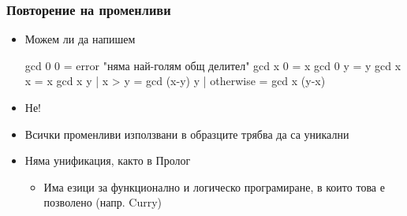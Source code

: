 \documentclass{beamer}
\begin{document}
\begin{frame}[fragile]
  \frametitle{Повторение на променливи}
  \begin{itemize}[<+->]
  \item Можем ли да напишем
\begin{semiverbatim}
gcd 0 0 = error "няма най-голям общ делител"
gcd x 0 = x
gcd 0 y = y
\alert{gcd x x = x}
gcd x y
 | x > y     = gcd (x-y) y
 | otherwise = gcd x (y-x)
\end{semiverbatim}
  \item \alert{Не!}
  \item Всички променливи използвани в образците трябва да са уникални
  \item Няма унификация, както в Пролог
    \begin{itemize}
    \item Има езици за функционално и логическо програмиране, в които това е позволено (напр. Curry)
    \end{itemize}
\end{itemize}
\end{frame}
\end{document}
